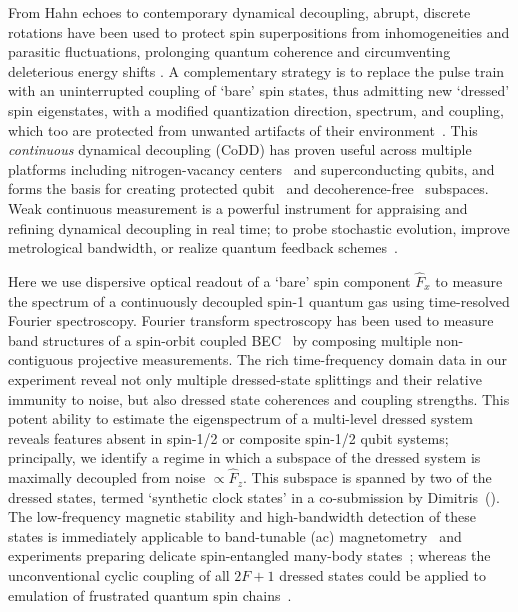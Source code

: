 \documentclass[aps,prl,reprint,superscriptaddress,floatfix]{revtex4-1}
\begin{document}
From Hahn echoes to contemporary dynamical decoupling, abrupt, discrete rotations have been used to protect spin superpositions from inhomogeneities and parasitic fluctuations, prolonging quantum coherence and circumventing deleterious energy shifts \cite{biercuk_optimized_2009,lange_universal_2010,bluhm_dephasing_2011}.
A complementary strategy is to replace the pulse train with an uninterrupted coupling of `bare' spin states, thus admitting new `dressed' spin eigenstates, with a modified quantization direction, spectrum, and coupling, which too are protected from unwanted artifacts of their environment~\cite{fanchini_continuously_2007}.
This \textit{continuous} dynamical decoupling (CoDD) has proven useful across multiple platforms including nitrogen-vacancy centers~\cite{hirose_continuous_2012,loretz_radio-frequency_2013,cai_robust_2012,*cai_long-lived_2012,golter_protecting_2014} and superconducting qubits, and forms the basis for creating protected qubit~\cite{aharon_general_2013} and decoherence-free~\cite{facchi_quantum_2002,*facchi_unification_2004} subspaces.
Weak continuous measurement is a powerful instrument for appraising and refining dynamical decoupling in real time; to probe stochastic evolution, improve metrological bandwidth, or realize quantum feedback schemes~\cite{vijay_stabilizing_2012}.

Here we use dispersive optical readout of a `bare' spin component $\hat{F}_x$ to measure the spectrum of a continuously decoupled spin-1 quantum gas using time-resolved Fourier spectroscopy. 
Fourier transform spectroscopy has been used to measure band structures of a spin-orbit coupled BEC~\cite{valdes-curiel_fourier_2017} by composing multiple non-contiguous projective measurements.
The rich time-frequency domain data in our experiment reveal not only multiple dressed-state splittings and their relative immunity to noise, but also dressed state coherences and coupling strengths.
This potent ability to estimate the eigenspectrum of a multi-level dressed system reveals features absent in spin-1/2 or composite spin-1/2 qubit systems; principally, we identify a regime in which a subspace of the dressed system is maximally decoupled from noise $\propto \hat{F}_z$.
This subspace is spanned by two of the dressed states, termed `synthetic clock states' in a co-submission by Dimitris~\etal (\dimitris).
The low-frequency magnetic stability and high-bandwidth detection of these states is immediately applicable to band-tunable (ac) magnetometry~\cite{hirose_continuous_2012,loretz_radio-frequency_2013,ockeloen_quantum_2013,*horsley_frequency-tunable_2016} and experiments preparing delicate spin-entangled many-body states~\cite{stamper-kurn_spinor_2013}; whereas the unconventional cyclic coupling of all $2F+1$ dressed states could be applied to emulation of frustrated quantum spin chains~\cite{mikeska_one-dimensional_2004}.
\end{document}
